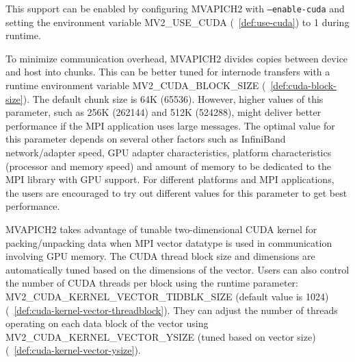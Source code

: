 This support can be enabled by configuring MVAPICH2 with \texttt{--enable-cuda} and
setting the environment variable MV2\_USE\_CUDA (~\ref{def:use-cuda}) to 1
during runtime.

To minimize communication overhead, MVAPICH2 divides copies between device and
host into chunks.  This can be better tuned for internode transfers with a
runtime environment variable MV2\_CUDA\_BLOCK\_SIZE
(~\ref{def:cuda-block-size}).  The default chunk size is 64K (65536). However,
higher values of this parameter, such as 256K (262144) and 512K (524288), might
deliver better performance if the MPI application uses large messages. The
optimal value for this parameter depends on several other factors such as
InfiniBand network/adapter speed, GPU adapter characteristics, platform
characteristics (processor and memory speed) and amount of memory to be
dedicated to the MPI library with GPU support. For different platforms and MPI
applications, the users are encouraged to try out different values for this
parameter to get best performance.

MVAPICH2 takes advantage of tunable two-dimensional CUDA kernel for
packing/unpacking data when MPI vector datatype is used in communication
involving GPU memory. The CUDA thread block size and dimensions are
automatically tuned based on the dimensions of the vector. Users can also
control the number of CUDA threads per block using the runtime parameter:
MV2\_CUDA\_KERNEL\_VECTOR\_TIDBLK\_SIZE (default value is 1024)
(~\ref{def:cuda-kernel-vector-threadblock}).  They can adjust the number of
threads operating on each data block of the vector using \\
MV2\_CUDA\_KERNEL\_VECTOR\_YSIZE (tuned based on vector size)
(~\ref{def:cuda-kernel-vector-ysize}).


